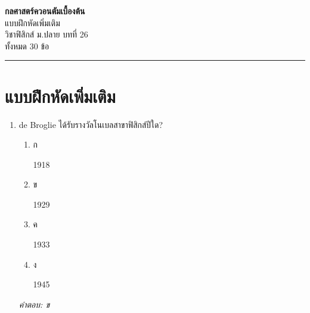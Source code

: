 \documentclass[12pt]{article}
\begin{document}
\begin{center}
{\Large\textbf{กลศาสตร์ควอนตัมเบื้องต้น}}\\[6pt]
{\normalsize แบบฝึกหัดเพิ่มเติม}\\[6pt]
{\normalsize วิชาฟิสิกส์ ม.ปลาย บทที่ 26}\\[4pt]
{\footnotesize ทั้งหมด 30 ข้อ}
\end{center}
\hrule
\bigskip

\section*{แบบฝึกหัดเพิ่มเติม}
\begin{enumerate}[label=\arabic*., itemsep=0.5\baselineskip, topsep=0.5\baselineskip, leftmargin=*]
\item de Broglie ได้รับรางวัลโนเบลสาขาฟิสิกส์ปีใด?
\begin{enumerate}[label=\alph*)., itemsep=0.3\baselineskip, topsep=0.3\baselineskip]
\item ก\ 
\begin{minipage}[t]{0.9\linewidth}
\raggedright 1918
\end{minipage}
\item ข\ 
\begin{minipage}[t]{0.9\linewidth}
\raggedright 1929
\end{minipage}
\item ค\ 
\begin{minipage}[t]{0.9\linewidth}
\raggedright 1933
\end{minipage}
\item ง\ 
\begin{minipage}[t]{0.9\linewidth}
\raggedright 1945
\end{minipage}
\end{enumerate}
\vspace{-0.3\baselineskip}
\begin{small}
\textit{คำตอบ: ข}
\end{small}


\end{enumerate}
\end{document}
